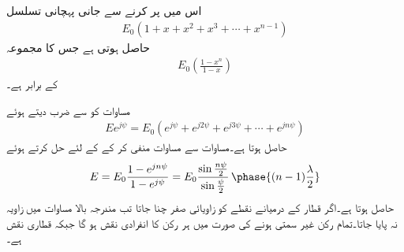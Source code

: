 اس میں  پر کرنے سے جانی پہچانی تسلسل
\begin{align*}
E_0 \left(1+x+x^2+x^3+\cdots+x^{n-1}\right)
\end{align*}
حاصل ہوتی ہے جس کا مجموعہ
\begin{align*}
E_0\left(\frac{1-x^{n}}{1-x}\right)
\end{align*}
کے برابر ہے۔

مساوات  کو  سے ضرب دیتے ہوئے
\begin{align}\label{مساوات_اینٹینا_یکساں_قطار_ب}
E e^{j\psi}=E_0\left(e^{j \psi}+e^{j 2 \psi}+e^{j 3 \psi} +\cdots +e^{jn\psi} \right)
\end{align}
حاصل ہوتا ہے۔مساوات  سے مساوات  منفی کر کے  کے لئے حل کرتے  ہوئے
\begin{align}
E=E_0 \frac{1-e^{j n \psi}}{1-e^{j\psi}}=E_0 \frac{\sin \frac{n\psi}{2}}{\sin \frac{\psi}{2}} \, \phase{(n-1)\frac{\lambda}{2}}
\end{align}
حاصل ہوتا ہے۔اگر قطار کے درمیانے نقطے کو زاویائی صفر چنا جاتا تب مندرجہ بالا مساوات میں زاویہ  نہ پایا جاتا۔تمام رکن غیر سمتی ہونے کی صورت میں  ہر رکن کا انفرادی نقش ہو گا جبکہ  قطاری نقش  ہے۔

